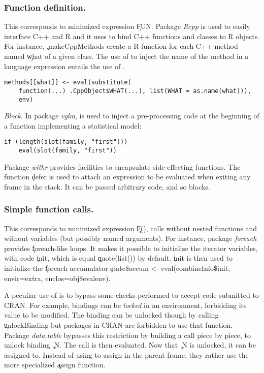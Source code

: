 \documentclass[review,screen,acmsmall,anonymous=true]{acmart}
\newcommand{\mypara}[1]{\medskip\noindent\emph{#1}\xspace}
\begin{document}
\subsubsection{Function definition.} This corresponds to minimized expression \c{FUN}. Package \emph{Rcpp} is used to easily interface C++ and R and it uses \eval to bind C++ functions and classes to R objects.
For instance, \c{.makeCppMethods} create a R function for each C++ method named \c{what} of a given class. The use of \substitute to inject the name of the method in a language expression entails the use of \eval.
\begin{lstlisting}
methods[[what]] <- eval(substitute(
	function(...) .CppObject$WHAT(...), list(WHAT = as.name(what))),
	env)
\end{lstlisting}

\mypara{Block.} In package \emph{vglm}, \eval is used to inject a pre-processing code at the beginning of a function implementing a statistical model: 
\begin{lstlisting}
if (length(slot(family, "first"))) 
	eval(slot(family, "first"))
\end{lstlisting}

Package \emph{withr} provides facilities to encapsulate side-effecting functions. The function \c{defer} is used to attach an expression to be evaluated when exiting any frame in the stack. It can be passed arbitrary code, and so blocks. 

\subsubsection{Simple function calls.} This corresponds to minimized expression \c{F()}, \ie calls without nested functions and without variables (but possibly named arguments). For instance, package \emph{foreach} provides \c{foreach}-like loops. It makes it possible to initialize the iterator variables, with code \c{init}, which is equal \c{quote(list())} by default. \c{init} is then used to initialize the \c{foreach} accumulator \c{state\$accum <- eval(combineInfo\$init, envir=extra, enclos=obj\$evalenv)}.

A peculiar use of \eval is to bypass some checks performed to accept code submitted to CRAN. For example, bindings can be \emph{locked} in an environment, \ie forbidding its value to be modified. The binding can be unlocked though by calling \c{unlockBinding} but packages in CRAN are forbidden to use that function.  Package \emph{data.table} bypasses this restriction by building a call piece by piece, to unlock binding \c{.N}. The call is then evaluated. Now that \c{.N} is unlocked, it can be assigned to. Instead of using \eval to assign in the parent frame, they rather use the more specialized \c{assign} function.
\end{document}
